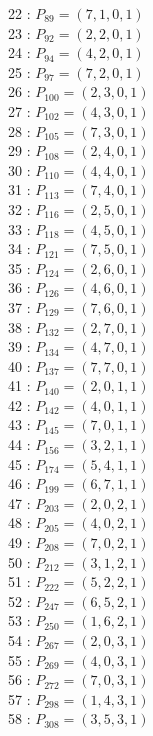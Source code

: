 \documentclass{article}
\begin{document}
{\begin{multicols}{3}
22 : $P_{89}=( 7, 1, 0, 1 )$\\
23 : $P_{92}=( 2, 2, 0, 1 )$\\
24 : $P_{94}=( 4, 2, 0, 1 )$\\
25 : $P_{97}=( 7, 2, 0, 1 )$\\
26 : $P_{100}=( 2, 3, 0, 1 )$\\
27 : $P_{102}=( 4, 3, 0, 1 )$\\
28 : $P_{105}=( 7, 3, 0, 1 )$\\
29 : $P_{108}=( 2, 4, 0, 1 )$\\
30 : $P_{110}=( 4, 4, 0, 1 )$\\
31 : $P_{113}=( 7, 4, 0, 1 )$\\
32 : $P_{116}=( 2, 5, 0, 1 )$\\
33 : $P_{118}=( 4, 5, 0, 1 )$\\
34 : $P_{121}=( 7, 5, 0, 1 )$\\
35 : $P_{124}=( 2, 6, 0, 1 )$\\
36 : $P_{126}=( 4, 6, 0, 1 )$\\
37 : $P_{129}=( 7, 6, 0, 1 )$\\
38 : $P_{132}=( 2, 7, 0, 1 )$\\
39 : $P_{134}=( 4, 7, 0, 1 )$\\
40 : $P_{137}=( 7, 7, 0, 1 )$\\
41 : $P_{140}=( 2, 0, 1, 1 )$\\
42 : $P_{142}=( 4, 0, 1, 1 )$\\
43 : $P_{145}=( 7, 0, 1, 1 )$\\
44 : $P_{156}=( 3, 2, 1, 1 )$\\
45 : $P_{174}=( 5, 4, 1, 1 )$\\
46 : $P_{199}=( 6, 7, 1, 1 )$\\
47 : $P_{203}=( 2, 0, 2, 1 )$\\
48 : $P_{205}=( 4, 0, 2, 1 )$\\
49 : $P_{208}=( 7, 0, 2, 1 )$\\
50 : $P_{212}=( 3, 1, 2, 1 )$\\
51 : $P_{222}=( 5, 2, 2, 1 )$\\
52 : $P_{247}=( 6, 5, 2, 1 )$\\
53 : $P_{250}=( 1, 6, 2, 1 )$\\
54 : $P_{267}=( 2, 0, 3, 1 )$\\
55 : $P_{269}=( 4, 0, 3, 1 )$\\
56 : $P_{272}=( 7, 0, 3, 1 )$\\
57 : $P_{298}=( 1, 4, 3, 1 )$\\
58 : $P_{308}=( 3, 5, 3, 1 )$\\

\end{multicols}}
\end{document}
